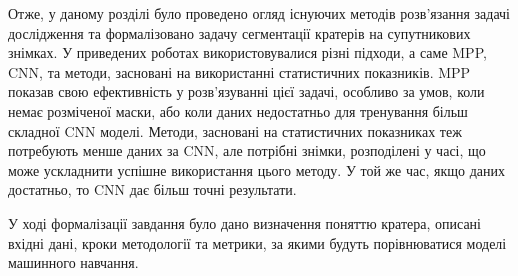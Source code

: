 Отже, у даному розділі було проведено огляд існуючих методів
розв'язання задачі дослідження та формалізовано задачу
сегментації кратерів на супутникових знімках.
У приведених роботах використовувалися різні підходи, а саме MPP, CNN, та
методи, засновані на використанні статистичних показників.
MPP показав свою ефективність у розв'язуванні цієї задачі, особливо
за умов, коли немає розміченої маски, або коли даних недостатньо для
тренування більш складної CNN моделі. Методи, засновані
на статистичних показниках теж потребують менше даних за CNN,
але потрібні знімки, розподілені у часі, що може ускладнити успішне використання
цього методу.
У той же час, якщо даних достатньо,
то CNN дає більш точні результати.

У ході формалізації завдання було дано визначення поняттю кратера,
описані вхідні дані, кроки методології та метрики, за якими будуть
порівнюватися моделі машинного навчання.